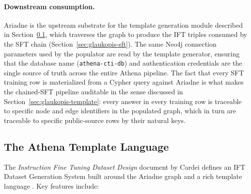 \documentclass[unnumsec,webpdf,contemporary,large]{oup-authoring-template}
\theoremstyle{thmstyleone}
\theoremstyle{thmstyletwo}
\theoremstyle{thmstylethree}
\begin{document}
\paragraph{Downstream consumption.}
Ariadne is the upstream substrate for the template generation module described in Section~\ref{sec:ariadne-templates}, which traverses the graph to produce the IFT triples consumed by the SFT chain (Section~\ref{sec:glaukopis-sft}). The same Neo4j connection parameters used by the populator are read by the template generator, ensuring that the database name (\texttt{athena-cti-db}) and authentication credentials are the single source of truth across the entire Athena pipeline. The fact that every SFT training row is materialized from a Cypher query against Ariadne is what makes the chained-SFT pipeline auditable in the sense discussed in Section~\ref{sec:glaukopis-template}: every answer in every training row is traceable to specific node and edge identifiers in the populated graph, which in turn are traceable to specific public-source rows by their natural keys.

\subsection{The Athena Template Language}
\label{sec:ariadne-templates}

The \emph{Instruction Fine Tuning Dataset Design} document by Cardei defines an IFT Dataset Generation System built around the Ariadne graph and a rich template language \cite{cardei2025ift}. Key features include:
\end{document}
